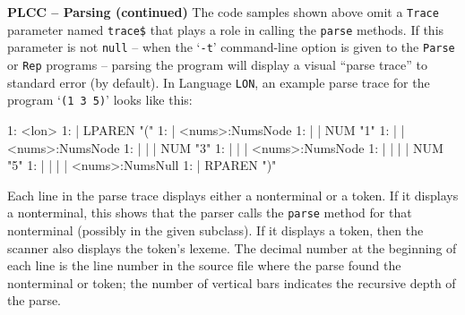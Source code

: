 \begin{minipage}[t]{\sw}
\slidenumber
\LARGE
{\bf PLCC -- Parsing (continued)}\exx
The code samples shown above
omit a \verb'Trace' parameter named \verb'trace$'
that plays a role in calling the \verb'parse' methods.
If this parameter is not \verb'null' --
when the `\verb'-t'' command-line option is given
to the \verb'Parse' or \verb'Rep' programs --
parsing the program
will display a visual ``parse trace'' to standard error (by default).
In Language \verb'LON', an example parse trace
for the program `\verb'(1 3 5)'' looks like this:
{\Large
\begin{qv}
   1: <lon>
   1: | LPAREN "("
   1: | <nums>:NumsNode
   1: | | NUM "1"
   1: | | <nums>:NumsNode
   1: | | | NUM "3"
   1: | | | <nums>:NumsNode
   1: | | | | NUM "5"
   1: | | | | <nums>:NumsNull
   1: | RPAREN ")"
\end{qv}
}
Each line in the parse trace displays
either a nonterminal or a token.
If it displays a nonterminal,
this shows that the parser calls
the \verb'parse' method for that nonterminal
(possibly in the given subclass).
If it displays a token,
then the scanner also displays the token's lexeme.
The decimal number at the beginning of each line
is the line number in the source file where the parse found
the nonterminal or token;
the number of vertical bars indicates
the recursive depth of the parse.
\end{minipage}
\clearpage

